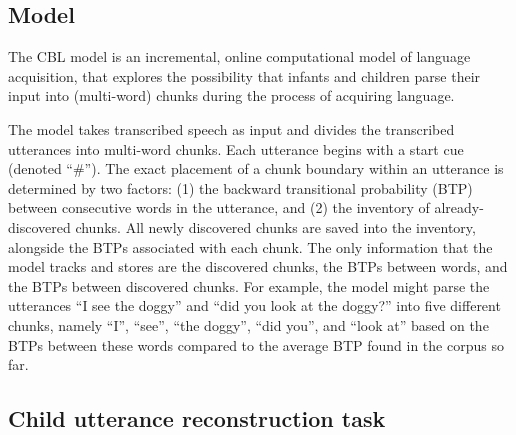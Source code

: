 \documentclass{article}
\begin{document}
\subsection{Model}

The CBL model \cite{mccauley2011learning} is an incremental, online computational model of language acquisition, that explores the possibility that infants and children parse their input into (multi-word) chunks during the process of acquiring language. 

The model takes transcribed speech as input and divides the transcribed utterances into multi-word chunks. Each utterance begins with a start cue (denoted ``\#''). The exact placement of a chunk boundary within an utterance is determined by two factors: (1) the backward transitional probability (BTP) between consecutive words in the utterance, and (2) the inventory of already-discovered chunks. All newly discovered chunks are saved into the inventory, alongside the BTPs associated with each chunk. The only information that the model tracks and stores are the discovered chunks, the BTPs between words, and the BTPs between discovered chunks.  For example, the model might parse the utterances ``I see the doggy'' and ``did you look at the doggy?'' into five different chunks, namely ``I'', ``see'', ``the doggy'', ``did you'', and ``look at'' based on the BTPs between these words compared to the average BTP found in the corpus so far.

\subsection{Child utterance reconstruction task}
\end{document}
